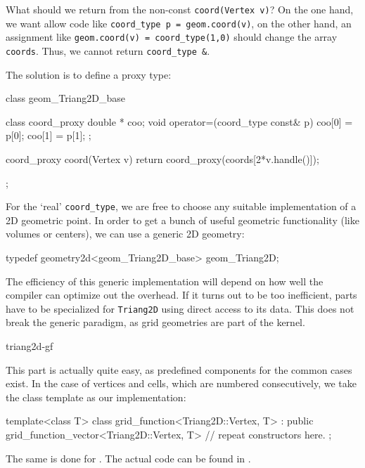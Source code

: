 What should we return from 
the non-const \texttt{coord(Vertex v)}?
On the one hand, we want allow code like
\texttt{coord\_type p = geom.coord(v)},
on the other hand, an assignment like
\texttt{geom.coord(v) = coord\_type(1,0)} should change the
array \texttt{coords}.
Thus, we cannot return \texttt{coord\_type \&}.

The solution is to define a proxy type:

\begin{example}
class geom_Triang2D_base {

   class coord_proxy {
     double * coo;
     void operator=(coord_type const& p) 
     {  coo[0] = p[0]; coo[1] = p[1]; }
   };

   coord_proxy        coord(Vertex v) 
   { return coord_proxy(coords[2*v.handle()]);}
};
\end{example}


For the `real' \texttt{coord\_type}, 
we are free to choose any suitable implementation
of a 2D geometric point.
In order to get a bunch of useful geometric functionality
(like volumes or centers), 
we can use a generic 2D geometry:

\begin{example}
 typedef geometry2d<geom_Triang2D_base>  geom_Triang2D;
\end{example}

The efficiency of this generic implementation will depend
on how well the compiler can optimize out the overhead.
If it turns out to be too inefficient, 
parts have to be specialized for \texttt{Triang2D}
using direct  access to its data. 
This does not break the generic paradigm,
as grid geometries are part of the kernel.


\begin{Label}{triang2d-gf}
\end{Label}

This part is actually quite easy, as predefined components
for the common cases exist.
In the case of vertices and cells, which are
numbered consecutively, we take the class
template 
as our implementation:

\begin{example}
template<class T>
class grid_function<Triang2D::Vertex, T>
 : public grid_function_vector<Triang2D::Vertex, T> 
{
 // repeat constructors here.
};
\end{example}
The same is done for .
The actual code can be found in 
.

